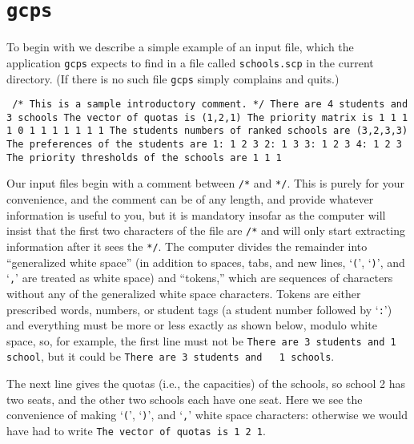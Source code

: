 \documentclass[12pt]{article}
\theoremstyle{definition}
\begin{document}
\section{\texttt{gcps}}

To begin with we describe a simple example of an input file, which the
application \texttt{gcps} expects to find in a file called
\texttt{schools.scp} in the current directory.  (If there is no such
file \texttt{gcps} simply complains and quits.)

\begin{obeylines}\texttt{
/* This is a sample introductory comment. */
There are 4 students and 3 schools
The vector of quotas is (1,2,1)
The priority matrix is
     1     1     1
     1     0     1
     1     1     1
     1     1     1
The students numbers of ranked schools are (3,2,3,3)
The preferences of the students are
1:  1  2  3  
2:  1  3  
3:  1  2  3  
4:  1  2  3  
The priority thresholds of the schools are
1   1   1   
  }
\end{obeylines}

\medskip

Our input files begin with a comment between \texttt{/*} and
\texttt{*/}.  This is purely for your convenience, and the comment can
be of any length, and provide whatever information is useful to you,
but it is mandatory insofar as the computer will insist that the first
two characters of the file are \texttt{/*} and will only start
extracting information after it sees the \texttt{*/}.  The computer
divides the remainder into ``generalized white space'' (in addition to
spaces, tabs, and new lines, `\texttt{(}', `\texttt{)}', and
`\texttt{,}' are treated as white space) and ``tokens,'' which are
sequences of characters without any of the generalized white space
characters.  Tokens are either prescribed words, numbers, or student
tags (a student number followed by `\texttt{:}') and everything must
be more or less exactly as shown below, modulo white space, so, for
example, the first line must not be \texttt{There are 3 students and 1
  school}, but it could be \texttt{There are 3 students and \ \ 1
  schools}.

The next line gives the quotas (i.e., the capacities) of the schools,
so school 2 has two seats, and the other two schools each have one
seat.  Here we see the convenience of making `\texttt{(}',
`\texttt{)}', and `\texttt{,}' white space characters: otherwise we
would have had to write \texttt{The vector of quotas is 1 2 1}.
\end{document}
